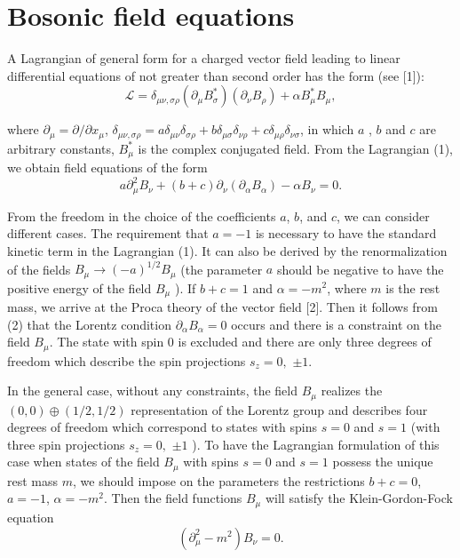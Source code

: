 \documentclass[a4paper,12pt]{article}
\begin{document}
\section{Bosonic field equations}

A Lagrangian of general form for a charged vector field leading to
linear differential equations of not greater than second order has
the form (see [1]):
\begin{equation}
\mathcal{L}=\delta _{\mu \nu ,\sigma \rho }\left( \partial _\mu
B^*_\sigma \right) \left( \partial _\nu B_\rho \right) +\alpha
B^*_\mu B_\mu,  \label{1}
\end{equation}

where $\partial _\mu =\partial /\partial x_\mu $, $\delta _{\mu
\nu ,\sigma \rho }=a\delta _{\mu \nu }\delta _{\sigma \rho
}+b\delta _{\mu \sigma }\delta _{\nu \rho }+c\delta _{\mu \rho
}\delta _{\nu \sigma }$, in which $a$ , $b$ and $c$ are arbitrary
constants, $B^*_\mu$ is the complex conjugated field. From the
Lagrangian (1), we obtain field equations of the form
\begin{equation}
a\partial _\mu ^2B_\nu +\left( b+c\right) \partial _\nu \left(
\partial _\alpha B_\alpha \right) -\alpha B_\nu =0.  \label{2}
\end{equation}

From the freedom in the choice of the coefficients $a$, $b$, and
$c$, we can consider different cases. The requirement that $a=-1$
is necessary to have the standard kinetic term in the Lagrangian
(1). It can also be derived by the renormalization of the fields
$B_\mu \rightarrow (-a)^{1/2}B_\mu $ (the parameter $a$ should be
negative to have the positive energy of the field $ B_\mu $ ). If
$b+c=1$ and $\alpha =-m^2$, where $m$ is the rest mass, we arrive
at the Proca theory of the vector field [2]. Then it follows from
(2) that the Lorentz condition $\partial _\alpha B_\alpha =0$
occurs and there is a constraint on the field $B_\mu $. The state
with spin $0$ is excluded and there are only three degrees of
freedom which describe the spin projections $s_z=0,$ $\pm 1$.

In the general case, without any constraints, the field $B_\mu $
realizes the $\left( 0,0\right) \oplus \left( 1/2,1/2\right) $
representation of the Lorentz group and describes four degrees of
freedom which correspond to states with spins $s=0$ and $s=1$
(with three spin projections $s_z=0,$ $\pm 1$ ). To have the
Lagrangian formulation of this case when states of the field
$B_\mu $ with spins $s=0$ and $s=1$ possess the unique rest mass
$m$, we should impose on the parameters the restrictions $b+c=0$,
$a=-1$, $ \alpha =-m^2$. Then the field functions $B_\mu $ will
satisfy the Klein-Gordon-Fock equation
\begin{equation}
\left( \partial _\mu ^2-m^2\right) B_\nu =0.  \label{3}
\end{equation}
\end{document}
